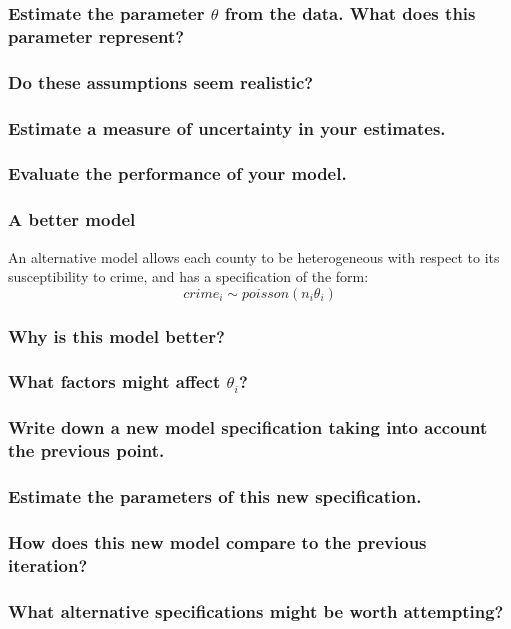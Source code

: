 \documentclass[11pt,fullpage]{book}
\begin{document}
\subsubsection{Estimate the parameter $\theta$ from the data. What does this parameter represent?}
\subsubsection{Do these assumptions seem realistic?}
\subsubsection{Estimate a measure of uncertainty in your estimates.}
\subsubsection{Evaluate the performance of your model.}

\subsubsection{A better model}
An alternative model allows each county to be heterogeneous with respect to its susceptibility to crime, and has a specification of the form:
\begin{equation}
crime_i \sim poisson(n_i\theta_i)
\end{equation}
\subsubsection{Why is this model better?}
\subsubsection{What factors might affect $\theta_i$?}
\subsubsection{Write down a new model specification taking into account the previous point.}
\subsubsection{Estimate the parameters of this new specification.}
\subsubsection{How does this new model compare to the previous iteration?}
\subsubsection{What alternative specifications might be worth attempting?}
\end{document}
